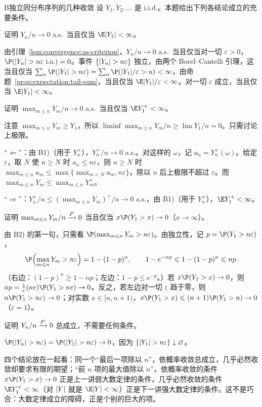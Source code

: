 \begin{probleme}{B}{独立同分布序列的几种收敛}
设 $Y_1,Y_2,\dots$ 是 i.i.d.。本题给出下列各结论成立的充要条件。
\begin{questions}
\item 证明 $Y_n/n\to0$ a.s.\ 当且仅当 $\E\abs{Y_1}<\infty$。
\begin{solution}
由引理~\ref{lem:convergence:as-criterion}，$Y_n/n\to0$ a.s.\ 当且仅当对一切 $\varepsilon>0$，$\P(\abs{Y_n}>n\varepsilon\ \text{i.o.})=0$。事件 $\{\lvert Y_n\rvert>n\varepsilon\}$ 独立，由两个 Borel--Cantelli 引理，这当且仅当 $\sum_n\P(\abs{Y_1}>n\varepsilon)=\sum_n\P(\abs{Y_1}/\varepsilon>n)<\infty$，由命题~\ref{prop:expectation:tail-sum}，当且仅当 $\E\abs{Y_1}/\varepsilon<\infty$。对一切 $\varepsilon$ 成立，当且仅当 $\E\abs{Y_1}<\infty$。
\end{solution}
\item 证明 $\max_{m\leqslant n}Y_m/n\to0$ a.s.\ 当且仅当 $\E Y_1^+<\infty$。
\begin{solution}
注意 $\max_{m\leqslant n}Y_m\geqslant Y_1$，所以 $\liminf\max_{m\leqslant n}Y_m/n\geqslant\lim Y_1/n=0$。只需讨论上极限。

“$\Leftarrow$”：由 B1)（用于 $Y_n^+$），$Y_n^+/n\to0$ a.s.。对这样的 $\omega$，记 $a_n=Y_n^+(\omega)$。给定 $\varepsilon$，取 $N$ 使 $n\geqslant N$ 时 $a_n\leqslant n\varepsilon$，则 $n\geqslant N$ 时 $\max_{m\leqslant n}a_m\leqslant\max\{\max_{m<N}a_m,n\varepsilon\}$，除以 $n$ 后上极限不超过 $\varepsilon$。而 $\max_{m\leqslant n}Y_m\leqslant\max_{m\leqslant n}Y_m^+$。

“$\Rightarrow$”：$Y_n^+/n\leqslant(\max_{m\leqslant n}Y_m)^+/n\to0$ a.s.，由 B1)（用于 $Y_n^+$），$\E Y_1^+<\infty$。
\end{solution}
\item 证明 $\max_{m\leqslant n}Y_m/n\xrightarrow{P}0$ 当且仅当 $x\P(Y_1>x)\to0$（$x\to\infty$）。
\begin{solution}
由 B2) 的第一句，只需看 $\P(\max_{m\leqslant n}Y_m>n\varepsilon)$。由独立性，记 $p=\P(Y_1>n\varepsilon)$，
\[
\P\Bigl(\max_{m\leqslant n}Y_m>n\varepsilon\Bigr)=1-(1-p)^n,\qquad 1-e^{-np}\leqslant1-(1-p)^n\leqslant np .
\]
（右边：$(1-p)^n\geqslant1-np$；左边：$1-p\leqslant e^{-p}$。）若 $x\P(Y_1>x)\to0$，则 $np=\frac1\varepsilon(n\varepsilon)\P(Y_1>n\varepsilon)\to0$。反之，若左边对一切 $\varepsilon$ 趋于零，则 $n\P(Y_1>n\varepsilon)\to0$；对实数 $x\in[n,n+1)$，$x\P(Y_1>x)\leqslant(n+1)\P(Y_1>n)\to0$（$\varepsilon=1$）。
\end{solution}
\item 证明 $Y_n/n\xrightarrow{P}0$ 总成立，不需要任何条件。
\begin{solution}
$\P(\abs{Y_n}>n\varepsilon)=\P(\abs{Y_1}>n\varepsilon)\to0$，因为 $\{\lvert Y_1\rvert>n\varepsilon\}\downarrow\varnothing$。

四个结论放在一起看：同一个“最后一项除以 $n$”，依概率收敛总成立，几乎必然收敛却要求有限的期望；“前 $n$ 项的最大值除以 $n$”，依概率收敛的条件 $x\P(Y_1>x)\to0$ 正是上一讲弱大数定律的条件，几乎必然收敛的条件 $\E Y_1^+<\infty$（对 $\lvert Y\rvert$ 就是 $\E\abs Y<\infty$）正是下一讲强大数定律的条件。这不是巧合：大数定律成立的障碍，正是个别的巨大的项。
\end{solution}
\end{questions}
\end{probleme}

